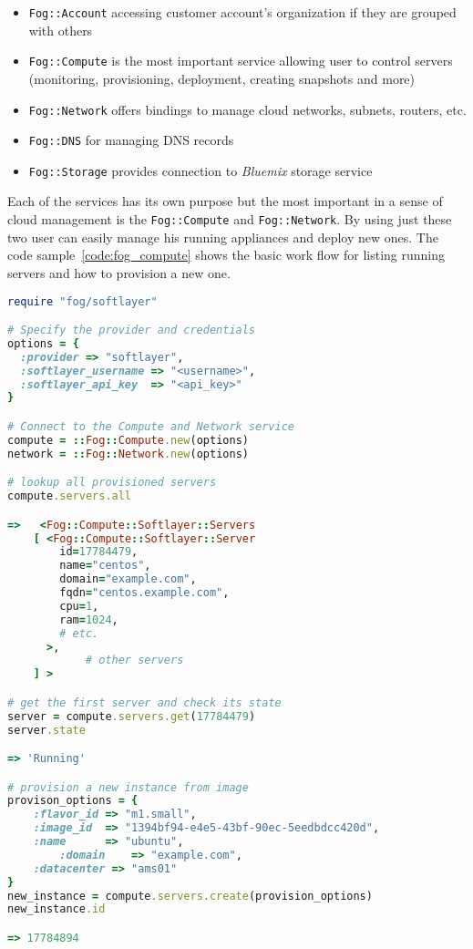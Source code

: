 \begin{itemize}
	\item \texttt{Fog::Account} accessing customer account's organization if they are grouped with others
	\item \texttt{Fog::Compute} is the most important service allowing user to control servers (monitoring, provisioning, deployment, creating snapshots and more)
	\item \texttt{Fog::Network} offers bindings to manage cloud networks, subnets, routers, etc.
	\item \texttt{Fog::DNS} for managing DNS records
	\item \texttt{Fog::Storage} provides connection to \emph{Bluemix} storage service
\end{itemize}

Each of the services has its own purpose but the most important in a sense of cloud management is the \texttt{Fog::Compute} and \texttt{Fog::Network}. By using just these two user can easily manage his running appliances and deploy new ones. The code sample~\ref{code:fog_compute} shows the basic work flow for listing running servers and how to provision a new one.

\begin{lstlisting}[language=Ruby,caption={Example work flow for Fog SoftLayer},label=code:fog_compute,float=htpb]
require "fog/softlayer"

# Specify the provider and credentials
options = {
  :provider => "softlayer",
  :softlayer_username => "<username>",
  :softlayer_api_key  => "<api_key>"
}

# Connect to the Compute and Network service
compute = ::Fog::Compute.new(options)
network = ::Fog::Network.new(options)

# lookup all provisioned servers
compute.servers.all

=>   <Fog::Compute::Softlayer::Servers
    [ <Fog::Compute::Softlayer::Server
        id=17784479,
        name="centos",
        domain="example.com",
        fqdn="centos.example.com",
        cpu=1,
        ram=1024,
        # etc.
      >,
			# other servers
    ] >

# get the first server and check its state
server = compute.servers.get(17784479)
server.state

=> 'Running'

# provision a new instance from image
provison_options = {
    :flavor_id => "m1.small",
    :image_id  => "1394bf94-e4e5-43bf-90ec-5eedbdcc420d",
    :name      => "ubuntu",
		:domain    => "example.com",
    :datacenter => "ams01"
}
new_instance = compute.servers.create(provision_options)
new_instance.id

=> 17784894
\end{lstlisting}

